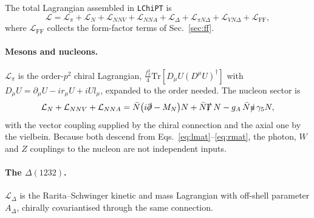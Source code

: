 \documentclass[11pt,a4paper]{article}
\newcommand{\code}[1]{\texttt{\small #1}}
\begin{document}
The total Lagrangian assembled in \code{LChiPT} is
\begin{equation}
  \mathcal{L} = \mathcal{L}_{\pi} + \mathcal{L}_{N} + \mathcal{L}_{NNV}
  + \mathcal{L}_{NNA} + \mathcal{L}_{\Delta}
  + \mathcal{L}_{\pi N\Delta} + \mathcal{L}_{VN\Delta}
  + \mathcal{L}_{\mathrm{FF}} ,
\end{equation}
where $\mathcal{L}_{\mathrm{FF}}$ collects the form-factor terms of
Sec.~\ref{sec:ff}.

\paragraph{Mesons and nucleons.}
$\mathcal{L}_\pi$ is the order-$p^2$ chiral Lagrangian,
$\tfrac{f_\pi^2}{4}\mathrm{Tr}\!\left[D_\mu U (D^\mu U)^\dagger\right]$ with
$D_\mu U = \partial_\mu U - i r_\mu U + i U l_\mu$, expanded to the order
needed. The nucleon sector is
\begin{equation}
  \mathcal{L}_{N} + \mathcal{L}_{NNV} + \mathcal{L}_{NNA}
  = \bar N\big(i\slashed\partial - M_N\big)N
  + \bar N \slashed{\Gamma}\, N
  - g_A\, \bar N \slashed{u}\,\gamma_5 N ,
\end{equation}
with the vector coupling supplied by the chiral connection and the axial one by
the vielbein. Because both descend from Eqs.~\eqref{eq:lmat}--\eqref{eq:rmat},
the photon, $W$ and $Z$ couplings to the nucleon are not independent inputs.

\paragraph{The $\Delta(1232)$.}
$\mathcal{L}_\Delta$ is the Rarita--Schwinger kinetic and mass Lagrangian with
off-shell parameter $A_\Delta$, chirally covariantised through the same
connection.
\end{document}
